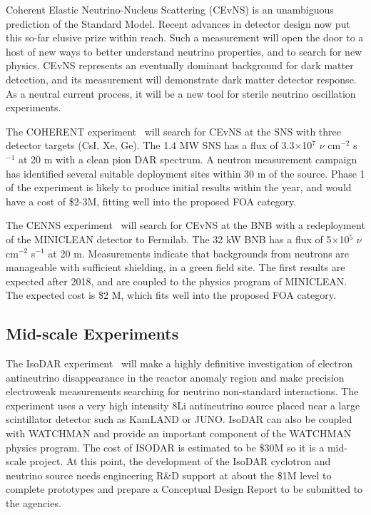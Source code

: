 
\noindent Coherent Elastic Neutrino-Nucleus Scattering (CEvNS) is an unambiguous prediction of the Standard Model.  Recent advances in detector design now put this so-far elusive prize within reach. Such a measurement will open the door to a host of new ways to better understand neutrino properties, and to search for new physics.   CEvNS represents an eventually dominant background for dark matter detection, and its measurement will demonstrate dark matter detector response.  As a neutral current process, it will be a new tool for sterile neutrino oscillation experiments.

The COHERENT experiment~\cite{coherent} will search for CEvNS at the SNS with three detector targets (CsI, Xe, Ge). The 1.4 MW SNS has a flux of 3.3$\times$10$^{7}$ $\nu$ cm$^{-2}$ s$^{-1}$ at 20 m with a clean pion DAR spectrum. A neutron measurement campaign has identified several suitable deployment sites within 30 m of the source. Phase 1 of the experiment is likely to produce initial results within the year, and would have a cost of \$2-3M, fitting well into the proposed FOA category.

The CENNS experiment~\cite{cenns} will search for CEvNS at the BNB with a redeployment of the MINICLEAN detector to Fermilab. The 32 kW BNB has a flux of 5$\times$10$^{5}$ $\nu$ cm$^{-2}$ s$^{-1}$ at 20 m. Measurements indicate that backgrounds from neutrons are manageable with sufficient shielding, in a green field site. The first results are expected after 2018, and are coupled to the physics program of MINICLEAN. The expected cost is \$2 M, which fits well into the proposed FOA category.

\subsection{Mid-scale Experiments}


\noindent The IsoDAR experiment~\cite{IsoDAR,IsoDARJuno} will make a highly definitive investigation of electron antineutrino disappearance in the reactor anomaly region and make precision electroweak measurements searching for neutrino non-standard interactions.  The experiment uses a very high intensity 8Li antineutrino source placed near a large scintillator detector such as KamLAND or JUNO.  IsoDAR can also be coupled with WATCHMAN and provide an important component of the WATCHMAN physics program.  The cost of ISODAR is estimated to be \$30M so it is a mid-scale project. At this point, the development of the IsoDAR cyclotron and neutrino source needs engineering R\&D support at about the \$1M level to complete prototypes and prepare a Conceptual Design Report to be submitted to the agencies.

